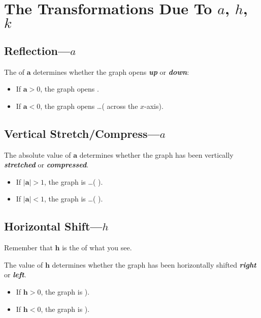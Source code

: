 \section{The Transformations Due To $a$, $h$, $k$}


\subsection{Reflection---$a$}

The  of $\bm{a}$ determines whether the graph 
opens {\bfseries\itshape up} or {\bfseries\itshape down}:
\begin{itemize}[topsep=-0.5\parskip]
    \item If $\bm{a}>0$, the graph opens .
    \item If $\bm{a}<0$, the graph opens \dots ( across the $x$-axis).
\end{itemize}


\subsection{Vertical Stretch/Compress---$a$}

The absolute value of $\bm{a}$ determines whether the graph 
has been vertically {\bfseries\itshape stretched} or {\bfseries\itshape compressed}.
\begin{itemize}[topsep=-0.5\parskip]
    \item If $|\bm{a}|>1$, the graph is \dots ( ).
    \item If $|\bm{a}|<1$, the graph is \dots    ( ).
\end{itemize}

\subsection{Horizontal Shift---$h$}

\begin{tcolorbox}[center,width=4.75in,colback=white,toprule=0.5pt,leftrule=0.5pt,rightrule=0.5pt,bottomrule=0.5pt,]
    \centering\small
    Remember that $\bm{h}$ is the  of what you see.
\end{tcolorbox}

The value of $\bm{h}$ determines whether the graph 
has been horizontally shifted {\bfseries\itshape right} or {\bfseries\itshape left}.
\begin{itemize}[topsep=-0.5\parskip]
    \item If $\bm{h}>0$, the graph is  ).
    \item If $\bm{h}<0$, the graph is  ).
\end{itemize}



